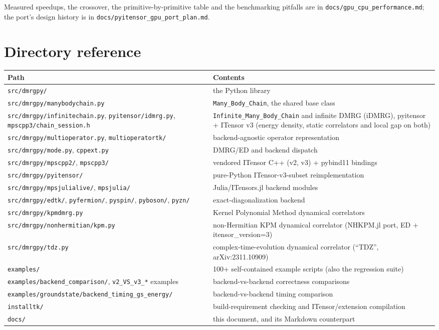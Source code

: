 \documentclass[11pt]{article}
\begin{document}
Measured speedups, the crossover, the primitive-by-primitive table and the
benchmarking pitfalls are in \texttt{docs/gpu\_cpu\_performance.md}; the
port's design history is in
\texttt{docs/pyitensor\_gpu\_port\_plan.md}.

\section{Directory reference}

\begin{center}
\begin{longtable}{@{}p{}p{}@{}}
\toprule
Path & Contents \\
\midrule
\endhead
\texttt{src/dmrgpy/} & the Python library \\
\texttt{src/dmrgpy/manybodychain.py} & \texttt{Many\_Body\_Chain}, the shared base class \\
\texttt{src/dmrgpy/infinitechain.py}, \texttt{pyitensor/idmrg.py}, \texttt{mpscpp3/chain\_session.h} & \texttt{Infinite\_Many\_Body\_Chain} and infinite DMRG (iDMRG), pyitensor + ITensor v3 (energy density, static correlators and local gap on both) \\
\texttt{src/dmrgpy/multioperator.py}, \texttt{multioperatortk/} & backend-agnostic operator representation \\
\texttt{src/dmrgpy/mode.py}, \texttt{cppext.py} & DMRG/ED and backend dispatch \\
\texttt{src/dmrgpy/mpscpp2/}, \texttt{mpscpp3/} & vendored ITensor C++ (v2, v3) + pybind11 bindings \\
\texttt{src/dmrgpy/pyitensor/} & pure-Python ITensor-v3-subset reimplementation \\
\texttt{src/dmrgpy/mpsjulialive/}, \texttt{mpsjulia/} & Julia/ITensors.jl backend modules \\
\texttt{src/dmrgpy/edtk/}, \texttt{pyfermion/}, \texttt{pyspin/}, \texttt{pyboson/}, \texttt{pyzn/} & exact-diagonalization backend \\
\texttt{src/dmrgpy/kpmdmrg.py} & Kernel Polynomial Method dynamical correlators \\
\texttt{src/dmrgpy/nonhermitian/kpm.py} & non-Hermitian KPM dynamical correlator (NHKPM.jl port, ED + itensor\_version=3) \\
\texttt{src/dmrgpy/tdz.py} & complex-time-evolution dynamical correlator (``TDZ'', arXiv:2311.10909) \\
\texttt{examples/} & 100+ self-contained example scripts (also the regression suite) \\
\texttt{examples/backend\_comparison/}, \texttt{v2\_VS\_v3\_*} examples & backend-vs-backend correctness comparisons \\
\texttt{examples/groundstate/\allowbreak backend\_timing\_gs\_energy/} & backend-vs-backend timing comparison \\
\texttt{installtk/} & build-requirement checking and ITensor/extension compilation \\
\texttt{docs/} & this document, and its Markdown counterpart \\
\bottomrule
\end{longtable}
\end{center}
\end{document}
